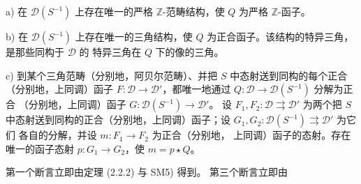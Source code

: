 \par\noindent a) 在 $\mathcal D(S^{-1})$ 上存在唯一的严格
$\mathbb Z$-范畴结构，使 $Q$ 为严格 $\mathbb Z$-函子。

\par\noindent b) 在 $\mathcal D(S^{-1})$ 上存在唯一的三角结构，使
$Q$ 为正合函子。该结构的特异三角，是那些同构于 $\mathcal D$ 的
特异三角在 $Q$ 下的像的三角。

\par\noindent c) 到某个三角范畴（分别地，阿贝尔范畴）、并把 $S$
中态射送到同构的每个正合（分别地，上同调）函子
$F\colon\mathcal D\longrightarrow\mathcal D'$，都唯一地通过
$Q\colon\mathcal D\longrightarrow\mathcal D(S^{-1})$ 分解为正合
（分别地，上同调）函子
$G\colon\mathcal D(S^{-1})\longrightarrow\mathcal D'$。
%
设 $F_1,F_2\colon\mathcal D\rightrightarrows\mathcal D'$ 为两个把
$S$ 中态射送到同构的正合（分别地，上同调）函子；设
$G_1,G_2\colon\mathcal D(S^{-1})\rightrightarrows\mathcal D'$ 为它们
各自的分解，并设 $m\colon F_1\longrightarrow F_2$ 为正合（分别地，
上同调）函子的态射。存在唯一的函子态射
$p\colon G_1\longrightarrow G_2$，使 $m=p\star Q$。
\endgroup

\par\noindent 第一个断言立即由定理 (2.2.2) 与 SM5) 得到。
%
第三个断言立即由

\endgroup
